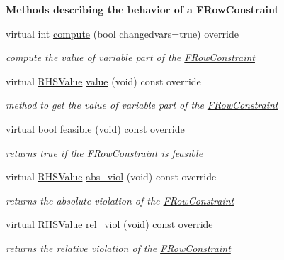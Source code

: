 \begin{Indent}\textbf{ Methods describing the behavior of a F\+Row\+Constraint}\par
\begin{DoxyCompactItemize}
\item 
virtual int \mbox{\hyperlink{class_s_m_spp__di__unipi__it_1_1_f_row_constraint_afc8ff54ab05d22f4cca0fb0bfbeb7a49}{compute}} (bool changedvars=true) override
\begin{DoxyCompactList}\small\item\em compute the value of variable part of the \mbox{\hyperlink{class_s_m_spp__di__unipi__it_1_1_f_row_constraint}{F\+Row\+Constraint}} \end{DoxyCompactList}\item 
virtual \mbox{\hyperlink{class_s_m_spp__di__unipi__it_1_1_row_constraint_a8813536ab3b13a81c8e83a999ade3bd8}{R\+H\+S\+Value}} \mbox{\hyperlink{class_s_m_spp__di__unipi__it_1_1_f_row_constraint_ad9256be16b98f3b557f54fa5e2118db7}{value}} (void) const override
\begin{DoxyCompactList}\small\item\em method to get the value of variable part of the \mbox{\hyperlink{class_s_m_spp__di__unipi__it_1_1_f_row_constraint}{F\+Row\+Constraint}} \end{DoxyCompactList}\item 
virtual bool \mbox{\hyperlink{class_s_m_spp__di__unipi__it_1_1_f_row_constraint_a508a569b1ce65668a4bbe261b0e2efab}{feasible}} (void) const override
\begin{DoxyCompactList}\small\item\em returns true if the \mbox{\hyperlink{class_s_m_spp__di__unipi__it_1_1_f_row_constraint}{F\+Row\+Constraint}} is feasible \end{DoxyCompactList}\item 
virtual \mbox{\hyperlink{class_s_m_spp__di__unipi__it_1_1_row_constraint_a8813536ab3b13a81c8e83a999ade3bd8}{R\+H\+S\+Value}} \mbox{\hyperlink{class_s_m_spp__di__unipi__it_1_1_f_row_constraint_a0d579ce7c4e40b1a0dc2dfc849942fb1}{abs\+\_\+viol}} (void) const override
\begin{DoxyCompactList}\small\item\em returns the absolute violation of the \mbox{\hyperlink{class_s_m_spp__di__unipi__it_1_1_f_row_constraint}{F\+Row\+Constraint}} \end{DoxyCompactList}\item 
virtual \mbox{\hyperlink{class_s_m_spp__di__unipi__it_1_1_row_constraint_a8813536ab3b13a81c8e83a999ade3bd8}{R\+H\+S\+Value}} \mbox{\hyperlink{class_s_m_spp__di__unipi__it_1_1_f_row_constraint_ae95c7d10b4128f20cefa7bb25628f5f5}{rel\+\_\+viol}} (void) const override
\begin{DoxyCompactList}\small\item\em returns the relative violation of the \mbox{\hyperlink{class_s_m_spp__di__unipi__it_1_1_f_row_constraint}{F\+Row\+Constraint}} \end{DoxyCompactList}\end{DoxyCompactItemize}
\end{Indent}
